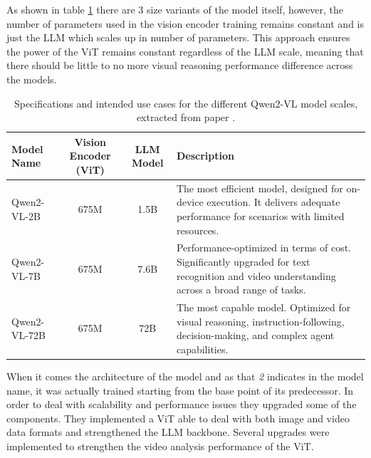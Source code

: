 As shown in table \ref{tab:qwen_variants} there are 3 size variants of the model itself, however, the number of parameters used in the vision encoder training remains constant and is just the LLM which scales up in number of parameters. This approach ensures the power of the ViT remains constant regardless of the LLM scale, meaning that there should be little to no more visual reasoning performance difference across the models. 

\begin{table}[htbp]
	\centering
	\small
	\begin{tabularx}{\textwidth}{@{} l c c X @{}}
		\toprule
		\textbf{Model Name} & \textbf{Vision Encoder (ViT)} & \textbf{LLM Model} & \textbf{Description} \\
		\midrule
		Qwen2-VL-2B  & 675M & 1.5B & The most efficient model, designed for on-device execution. It delivers adequate performance for scenarios with limited resources. \\
		\addlinespace
		Qwen2-VL-7B  & 675M & 7.6B & Performance-optimized in terms of cost. Significantly upgraded for text recognition and video understanding across a broad range of tasks. \\
		\addlinespace
		Qwen2-VL-72B & 675M & 72B  & The most capable model. Optimized for visual reasoning, instruction-following, decision-making, and complex agent capabilities. \\
		\bottomrule
	\end{tabularx}
	\vspace{5pt}
	\caption{Specifications and intended use cases for the different Qwen2-VL model scales, extracted from paper \cite{wang2024qwen2vlenhancingvisionlanguagemodels}.}
	\label{tab:qwen_variants}
\end{table}

When it comes the architecture of the model and as that \textit{2} indicates in the model name, it was actually trained starting from the base point of its predecessor. In order to deal with scalability and performance issues they upgraded some of the components. They implemented a ViT able to deal with both image and video data formats and strengthened the LLM backbone. Several upgrades were implemented to strengthen the video analysis performance of the ViT.

